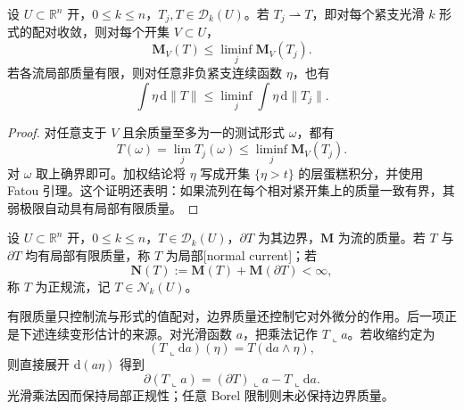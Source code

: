 \begin{proposition}\label{g3:prop:current-mass-lsc}
	设 \(U\subset\mathbb R^n\) 开，\(0\le k\le n\)，\(T_j,T\in\mathcal D_k(U)\)。若 \(T_j\rightharpoonup T\)，即对每个紧支光滑 \(k\) 形式的配对收敛，则对每个开集 \(V\subset U\)，
	\[
		\mathbf M_V(T)\le\liminf_j\mathbf M_V(T_j).
	\]
	若各流局部质量有限，则对任意非负紧支连续函数 \(\eta\)，也有
	\[
		\int\eta\,\mathrm d\|T\|\le\liminf_j\int\eta\,\mathrm d\|T_j\|.
	\]
\end{proposition}
\begin{proof}
	对任意支于 \(V\) 且余质量至多为一的测试形式 \(\omega\)，都有
	\[
		T(\omega)=\lim_jT_j(\omega)\le\liminf_j\mathbf M_V(T_j).
	\]
	对 \(\omega\) 取上确界即可。加权结论将 \(\eta\) 写成开集 \(\{\eta>t\}\) 的层蛋糕积分，并使用 Fatou 引理。这个证明还表明：如果流列在每个相对紧开集上的质量一致有界，其弱极限自动具有局部有限质量。
\end{proof}

\begin{definition}\label{g3:def:normal-current}
	设 \(U\subset\mathbb R^n\) 开，\(0\le k\le n\)，\(T\in\mathcal D_k(U)\)，\(\partial T\) 为其边界，\(\mathbf M\) 为流的质量。若 \(T\) 与 \(\partial T\) 均有局部有限质量，称 \(T\) 为局部[normal current]；若
	\[
		\mathbf N(T):=\mathbf M(T)+\mathbf M(\partial T)<\infty,
	\]
	称 \(T\) 为正规流，记 \(T\in\mathcal N_k(U)\)。
\end{definition}

有限质量只控制流与形式的值配对，边界质量还控制它对外微分的作用。后一项正是下述连续变形估计的来源。对光滑函数 \(a\)，把乘法记作 \(T\llcorner a\)。若收缩约定为
\[
	(T\llcorner\mathrm da)(\eta)=T(\mathrm da\wedge\eta),
\]
则直接展开 \(\mathrm d(a\eta)\) 得到
\begin{equation}\label{g3:eq:current-product-rule}
	\partial(T\llcorner a)=(\partial T)\llcorner a-T\llcorner\mathrm da.
\end{equation}
光滑乘法因而保持局部正规性；任意 Borel 限制则未必保持边界质量。

